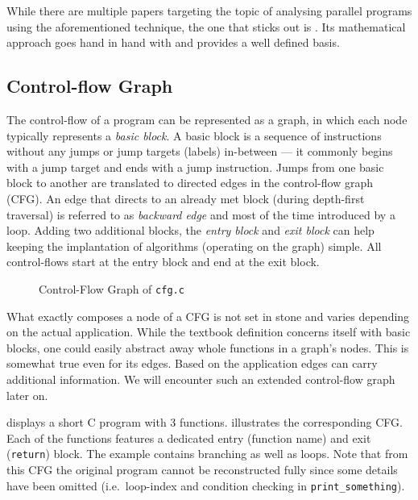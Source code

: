 \documentclass[article]{uibk}
\begin{document}
While there are multiple papers targeting the topic of analysing parallel
programs using the aforementioned technique, the one that sticks out is
\cite{parallel_cba}. Its mathematical approach goes hand in hand with
\cite{Nielson:ppa} and provides a well defined basis.

\subsection{Control-flow Graph}

The control-flow of a program can be represented as a graph, in which each node
typically represents a \textit{basic block}. A basic block is a sequence of
instructions without any jumps or jump targets (labels) in-between --- it
commonly begins with a jump target and ends with a jump instruction. Jumps from
one basic block to another are translated to directed edges in the control-flow
graph (CFG). An edge that directs to an already met block (during depth-first
traversal) is referred to as \textit{backward edge} and most of the time
introduced by a loop. Adding two additional blocks, the \textit{entry block}
and \textit{exit block} can help keeping the implantation of algorithms
(operating on the graph) simple. All control-flows start at the entry block and
end at the exit block.~\cite{wiki:cfg}

\begin{figure}
    \vspace{-1.4em}
    \centering
    
    \caption{Control-Flow Graph of \texttt{cfg.c}}
    \label{fig:cfg}
\end{figure}

What exactly composes a node of a CFG is not set in stone and varies depending
on the actual application. While the textbook definition concerns itself with
basic blocks, one could easily abstract away whole functions in a graph's
nodes. This is somewhat true even for its edges. Based on the application edges
can carry additional information. We will encounter such an extended
control-flow graph later on.

 displays a short C program with 3 functions. 
illustrates the corresponding CFG. Each of the functions features a dedicated
entry (function name) and exit (\texttt{return}) block. The example contains
branching as well as loops. Note that from this CFG the original program cannot
be reconstructed fully since some details have been omitted (i.e.\ loop-index
and condition checking in \texttt{print\_something}).
\end{document}
